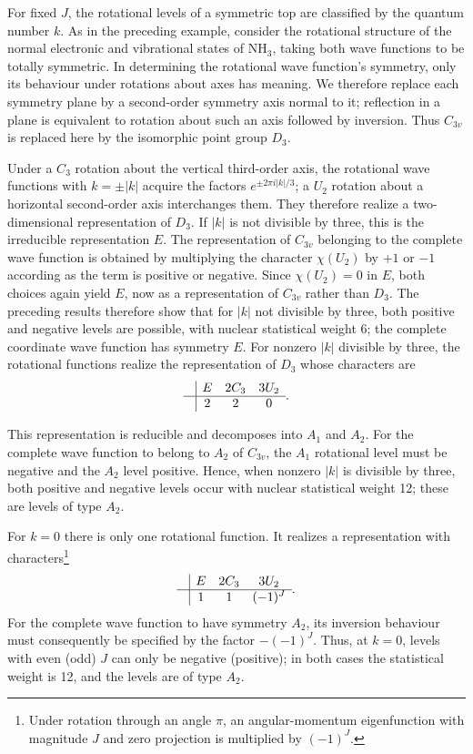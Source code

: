 For fixed $J$, the rotational levels of a symmetric top are classified by the quantum number $k$. As in the preceding example, consider the rotational structure of the normal electronic and vibrational states of $\mathrm{NH}_3$, taking both wave functions to be totally symmetric. In determining the rotational wave function's symmetry, only its behaviour under rotations about axes has meaning. We therefore replace each symmetry plane by a second-order symmetry axis normal to it; reflection in a plane is equivalent to rotation about such an axis followed by inversion. Thus $C_{3v}$ is replaced here by the isomorphic point group $D_3$.

Under a $C_3$ rotation about the vertical third-order axis, the rotational wave functions with $k=\pm|k|$ acquire the factors $e^{\pm2\pi i|k|/3}$; a $U_2$ rotation about a horizontal second-order axis interchanges them. They therefore realize a two-dimensional representation of $D_3$. If $|k|$ is not divisible by three, this is the irreducible representation $E$. The representation of $C_{3v}$ belonging to the complete wave function is obtained by multiplying the character $\chi(U_2)$ by $+1$ or $-1$ according as the term is positive or negative. Since $\chi(U_2)=0$ in $E$, both choices again yield $E$, now as a representation of $C_{3v}$ rather than $D_3$. The preceding results therefore show that for $|k|$ not divisible by three, both positive and negative levels are possible, with nuclear statistical weight 6; the complete coordinate wave function has symmetry $E$. For nonzero $|k|$ divisible by three, the rotational functions realize the representation of $D_3$ whose characters are
\[
\begin{array}{c|ccc}&E&2C_3&3U_2\\\hline&2&2&0\end{array}.
\]

This representation is reducible and decomposes into $A_1$ and $A_2$. For the complete wave function to belong to $A_2$ of $C_{3v}$, the $A_1$ rotational level must be negative and the $A_2$ level positive. Hence, when nonzero $|k|$ is divisible by three, both positive and negative levels occur with nuclear statistical weight 12; these are levels of type $A_2$.

For $k=0$ there is only one rotational function. It realizes a representation with characters\footnote{Under rotation through an angle $\pi$, an angular-momentum eigenfunction with magnitude $J$ and zero projection is multiplied by $(-1)^J$.}
\[
\begin{array}{c|ccc}&E&2C_3&3U_2\\\hline&1&1&(-1)^J\end{array}.
\]
For the complete wave function to have symmetry $A_2$, its inversion behaviour must consequently be specified by the factor $-(-1)^J$. Thus, at $k=0$, levels with even (odd) $J$ can only be negative (positive); in both cases the statistical weight is 12, and the levels are of type $A_2$.

